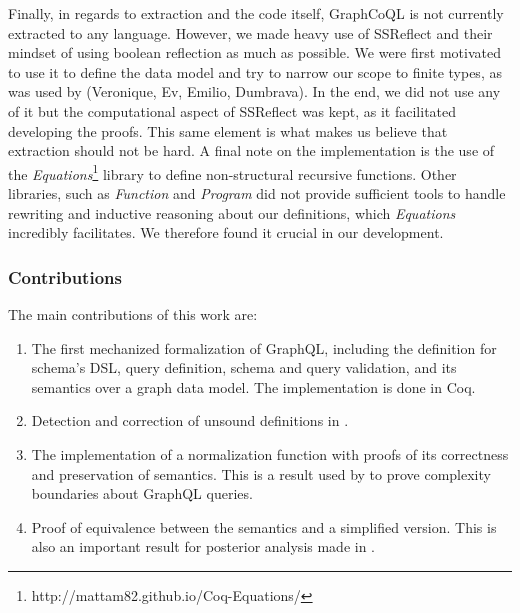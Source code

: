 
Finally, in regards to extraction and the code itself, GraphCoQL is not currently extracted to any language. However, we made heavy use of SSReflect and their mindset of using boolean reflection as much as possible. We were first motivated to use it to define the data model and try to narrow our scope to finite types, as was used by (Veronique, Ev, Emilio, Dumbrava). In the end, we did not use any of it but the computational aspect of SSReflect was kept, as it facilitated developing the proofs. This same element is what makes us believe that extraction should not be hard.
A final note on the implementation is the use of the \textit{Equations}\footnote{http://mattam82.github.io/Coq-Equations/} library to define non-structural recursive functions. Other libraries, such as \textit{Function} and \textit{Program} did not provide sufficient tools to handle rewriting and inductive reasoning about our definitions, which \textit{Equations} incredibly facilitates. We therefore found it crucial in our development.

\subsubsection*{Contributions}
The main contributions of this work are:
\begin{enumerate}
    \item The first mechanized formalization of GraphQL, including the definition for schema's DSL, query definition, schema and query validation, and its semantics over a graph data model.  The implementation is done in Coq.
    \item Detection and correction of unsound definitions in \HP{}.
    \item The implementation of a normalization function with proofs of its correctness and preservation of semantics. This is a result used by \HP{} to prove complexity boundaries about GraphQL queries.
    \item Proof of equivalence between the semantics and a simplified version. This is also an important result for posterior analysis made in \HP{}.

\end{enumerate}

